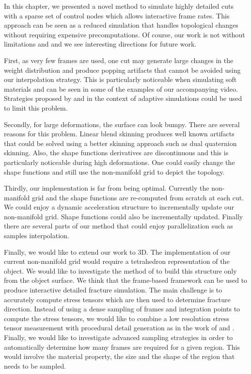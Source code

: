 In this chapter, we presented a novel method to simulate highly detailed cuts with a sparse set of control nodes which allows interactive frame rates. This approach can be seen as a reduced simulation that handles topological changes without requiring expensive precomputations. Of course, our work is not without limitations and and we see interesting directions for future work.

First, as very few frames are used, one cut may generate large changes in the weight distribution and produce popping artifacts that cannot be avoided using our interpolation strategy. This is particularly noticeable when simulating soft materials and can be seen in some of the examples of our accompanying video. Strategies proposed by \cite{Narain2013} and \cite{Tournier2014} in the context of adaptive simulations could be used to limit this problem. 

Secondly, for large deformations, the surface can look bumpy. There are several reasons for this problem. Linear blend skinning produces well known artifacts that could be solved using a better skinning approach such as dual quaternion skinning. Also, the shape functions derivatives are discontinuous and this is particularly noticeable during high deformations. One could easily change the shape functions and still use the non-manifold grid to depict the topology.

Thirdly, our implementation is far from being optimal. Currently the non-manifold grid and the shape functions are re-computed from scratch at each cut. We could enjoy a dynamic acceleration structure to incrementally update our non-manifold grid. Shape functions could also be incrementally updated. Finally there are several parts of our method that could enjoy parallelization such as samples interpolation.

Finally, we would like to extend our work to 3D. The implementation of our current non-manifold grid would require a tetrahedron representation of the object. We would like to investigate the method of \cite{Remillard2013} to build this structure only from the object surface. We think that the frame-based framework can be used to produce interactive detailed fracture simulation. The main challenge is to accurately compute stress tensors which are then used to determine fracture direction. Instead of using a dense sampling of frames and integration points to compute the stress tensors, we would like to combine a low resolution stress tensor measurement with procedural detail generation as in the work of \cite{Chen2014} and \cite{Lejemble2015}. Finally, we would like to investigate advanced sampling strategies in order to automatically determine how many frames are required for a given region. This would involve the material property, the size and the shape of the region that needs to be sampled.

